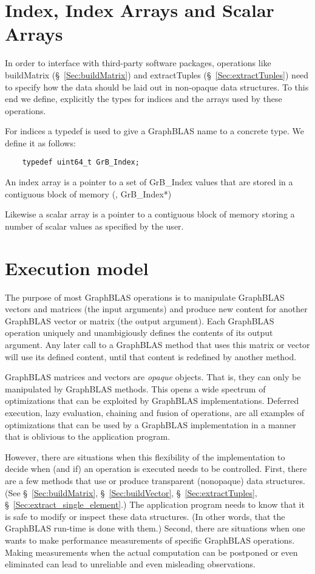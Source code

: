 \section{Index, Index Arrays and Scalar Arrays}

In order to interface with third-party software packages, operations like
buildMatrix (\S~\ref{Sec:buildMatrix})
and extractTuples (\S~\ref{Sec:extractTuples}) need to specify how the data should be
laid out in  non-opaque data structures.  To this end we define, explicitly
the types for indices and the arrays used by these operations.

For indices a typedef is used to give a GraphBLAS name to a concrete type. We define it as follows:

\begin{verbatim}
    typedef uint64_t GrB_Index;
\end{verbatim}

An index array is a pointer to a set of {\sf GrB\_Index} values that are stored in a contiguous block of memory (\ie, {\sf GrB\_Index*})

Likewise a scalar array is a pointer to a contiguous block of memory storing a number of scalar values as specified by the user.

\section{Execution model}

The purpose of most GraphBLAS operations is to manipulate GraphBLAS vectors and matrices
(the input arguments) and produce new content for another GraphBLAS vector or matrix (the output argument).
Each GraphBLAS operation uniquely and unambigiously defines the contents of its output argument.
Any later call to a GraphBLAS method that uses this matrix or vector will use its defined content, until
that content is redefined by another method.

GraphBLAS matrices and vectors are \emph{opaque} objects. That is, they can only be manipulated
by GraphBLAS methods. This opens a wide spectrum of optimizations that can be exploited by GraphBLAS implementations.
Deferred execution, lazy evaluation, chaining and fusion of operations, are all examples of optimizations
that can be used by a GraphBLAS implementation in a manner that is oblivious to the application program.

However, there are situations when this flexibility of the implementation to decide when (and if) an
operation is executed needs to be controlled. First, there are a few methods that use or produce transparent
(nonopaque) data structures. (See \S~\ref{Sec:buildMatrix}, \S~\ref{Sec:buildVector}, \S~\ref{Sec:extractTuples}, \S~\ref{Sec:extract_single_element}.) 
The application program needs to know that it is safe to modify or inspect
these data structures. (In other words, that the GraphBLAS run-time is done with them.)
Second, there are situations when one wants to make performance measurements of specific
GraphBLAS operations. Making measurements when the actual computation can be postponed or even 
eliminated can lead to unreliable and even misleading observations.

